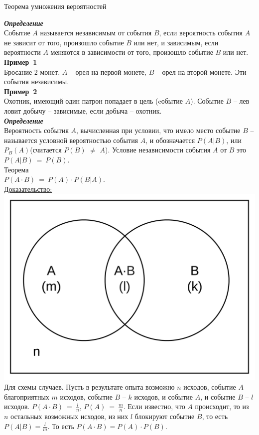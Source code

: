\documentclass[russian, 12pt, fleqn]{article}
\begin{document}
\begin{center}
$\textbf{Теорема умножения вероятностей }$
\end{center}
\textit{\textbf{Определение}}\\Событие $A$ называется независимым от события $B$, если вероятность события $A$ не зависит от того, произошло событие $B$ или нет, и зависимым, если вероятности $A$ меняются в зависимости от того, произошло событие $B$ или нет.\\
\textbf{Пример\ 1 }\\Бросание 2 монет. $A$ -- орел на первой монете, $B$ -- орел на второй монете. Эти события независимы.\\
\textbf{Пример\ 2 }\\Охотник, имеющий один патрон попадает в цель (cобытие $A$). Событие $B$ -- лев ловит добычу -- зависимые, если добыча -- охотник.\\
\textit{\textbf{Определение}}\\Вероятность события $A$, вычисленная при условии, что имело место событие $B$ -- называется условной вероятностью события $A$, и обозначается $P(A|B)$, или $P_B(A)$(считается $P(B)$ $\neq$ $A$). Условие независимости события $A$ от $B$ это $P(A|B)\ =\ P(B)$.\\
$\textbf{Теорема}$\\
 $P(A\cdot B)\ =\ P(A)\cdot P(B|A)$.\\
\underline{Доказательство:}\\
\includegraphics[scale=0.3]{Page9.png}\\
Для схемы случаев. Пусть в результате опыта возможно $n$ исходов, событие $A$ благоприятных $m$ исходов, событие $B$ -- $k$ исходов, и событие $A$, и событие $B$ -- $l$ исходов. $P(A\cdot B)\ =\ \frac{l}{n}$, $P(A)\ =\ \frac{m}{n}$. Если известно, что $A$ происходит, то из $n$ остальных возможных исходов, из них $l$ блокируют событие $B$, то есть  $P(A|B)=\frac{l}{m}$. То есть $P(A\cdot B) = P(A)\cdot P(B)$.\\
\end{document}
